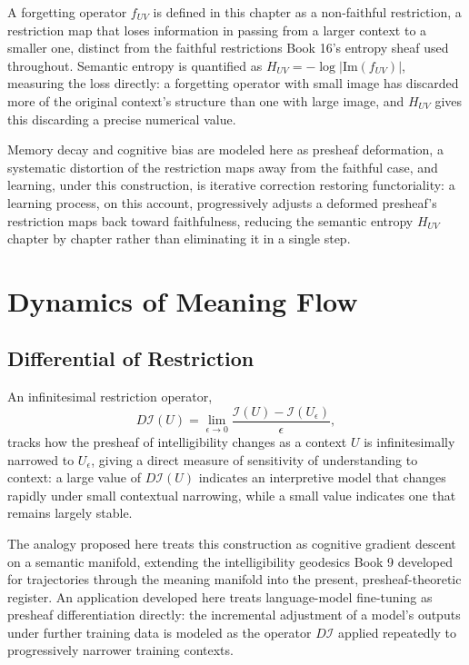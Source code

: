 A forgetting operator $f_{UV}$ is defined in this chapter as a non-faithful restriction, a restriction map that loses information in passing from a larger context to a smaller one, distinct from the faithful restrictions Book 16's entropy sheaf used throughout. Semantic entropy is quantified as $H_{UV} = -\log |\mathrm{Im}(f_{UV})|$, measuring the loss directly: a forgetting operator with small image has discarded more of the original context's structure than one with large image, and $H_{UV}$ gives this discarding a precise numerical value.

Memory decay and cognitive bias are modeled here as presheaf deformation, a systematic distortion of the restriction maps away from the faithful case, and learning, under this construction, is iterative correction restoring functoriality: a learning process, on this account, progressively adjusts a deformed presheaf's restriction maps back toward faithfulness, reducing the semantic entropy $H_{UV}$ chapter by chapter rather than eliminating it in a single step.

\part{Dynamics of Meaning Flow}

\chapter{Differential of Restriction}

An infinitesimal restriction operator,
\[
D\mathcal{I}(U) = \lim_{\epsilon \to 0} \frac{\mathcal{I}(U) - \mathcal{I}(U_\epsilon)}{\epsilon},
\]
tracks how the presheaf of intelligibility changes as a context $U$ is infinitesimally narrowed to $U_\epsilon$, giving a direct measure of sensitivity of understanding to context: a large value of $D\mathcal{I}(U)$ indicates an interpretive model that changes rapidly under small contextual narrowing, while a small value indicates one that remains largely stable.

The analogy proposed here treats this construction as cognitive gradient descent on a semantic manifold, extending the intelligibility geodesics Book 9 developed for trajectories through the meaning manifold into the present, presheaf-theoretic register. An application developed here treats language-model fine-tuning as presheaf differentiation directly: the incremental adjustment of a model's outputs under further training data is modeled as the operator $D\mathcal{I}$ applied repeatedly to progressively narrower training contexts.

